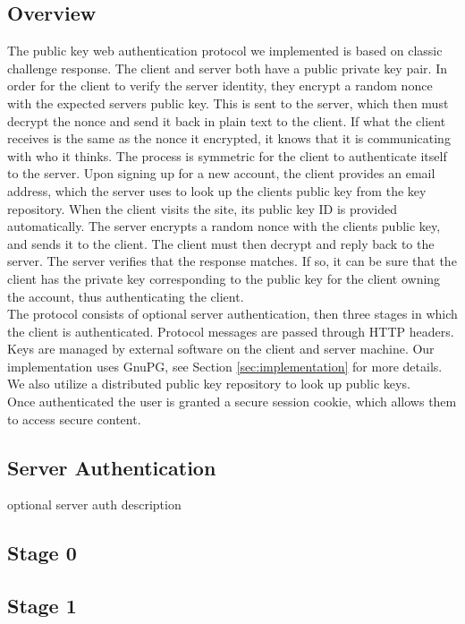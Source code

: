 \documentclass[11pt]{article}
\begin{document}
\subsection{Overview} \label{subsec:overview}
The public key web authentication protocol we implemented is based on classic challenge response. The client and server both have a public private key pair. In order for the client to verify the server identity, they encrypt a random nonce with the expected servers public key. This is sent to the server, which then must decrypt the nonce and send it back in plain text to the client. If what the client receives is the same as the nonce it encrypted, it knows that it is communicating with who it thinks. The process is symmetric for the client to authenticate itself to the server. Upon signing up for a new account, the client provides an email address, which the server uses to look up the clients public key from the key repository. When the client visits the site, its public key ID is provided automatically. The server encrypts a random nonce with the clients public key, and sends it to the client. The client must then decrypt and reply back to the server. The server verifies that the response matches. If so, it can be sure that the client has the private key corresponding to the public key for the client owning the account, thus authenticating the client.\\
The protocol consists of optional server authentication, then three stages in which the client is authenticated. Protocol messages are passed through HTTP headers. Keys are managed by external software on the client and server machine. Our implementation uses GnuPG, see Section \ref{sec:implementation} for more details. We also utilize a distributed public key repository to look up public keys.\\
Once authenticated the user is granted a secure session cookie, which allows them to access secure content.

\subsection{Server Authentication} \label{subsec:serverAuth}
optional server auth description
\subsection{Stage 0} \label{subsec:stage0}

\subsection{Stage 1} \label{subsec:stage1}
\end{document}
